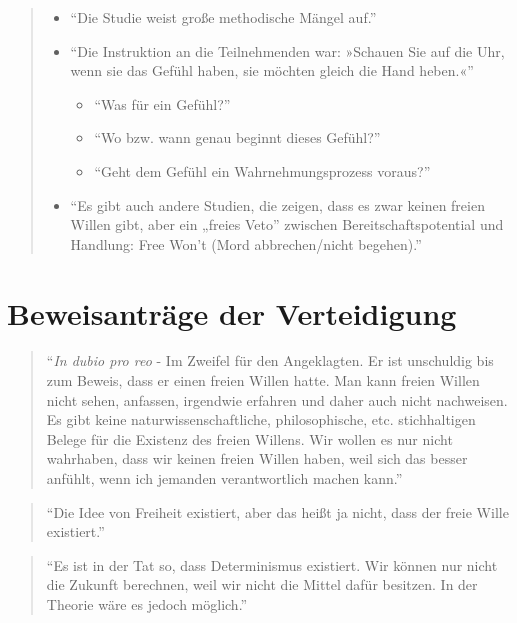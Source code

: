 \documentclass[
  a4paper,
]{report}
\begin{document}
\begin{quote}
\begin{itemize}
\item
  ``Die Studie weist große methodische Mängel auf.''
\item
  ``Die Instruktion an die Teilnehmenden war: »Schauen Sie auf die Uhr, wenn sie das Gefühl haben, sie möchten gleich die Hand heben.«''

  \begin{itemize}
  \item
    ``Was für ein Gefühl?''
  \item
    ``Wo bzw. wann genau beginnt dieses Gefühl?''
  \item
    ``Geht dem Gefühl ein Wahrnehmungsprozess voraus?''
  \end{itemize}
\item
  ``Es gibt auch andere Studien, die zeigen, dass es zwar keinen freien Willen gibt, aber ein „freies Veto'' zwischen Bereitschaftspotential und Handlung: Free Won't (Mord abbrechen/nicht begehen).''
\end{itemize}
\end{quote}

\hypertarget{def-ev}{%
\section{Beweisanträge der Verteidigung}\label{def-ev}}

\begin{quote}
``\emph{In dubio pro reo} - Im Zweifel für den Angeklagten. Er ist unschuldig bis zum Beweis, dass er einen freien Willen hatte. Man kann freien Willen nicht sehen, anfassen, irgendwie erfahren und daher auch nicht nachweisen. Es gibt keine naturwissenschaftliche, philosophische, etc. stichhaltigen Belege für die Existenz des freien Willens. Wir wollen es nur nicht wahrhaben, dass wir keinen freien Willen haben, weil sich das besser anfühlt, wenn ich jemanden verantwortlich machen kann.''
\end{quote}

\begin{quote}
``Die Idee von Freiheit existiert, aber das heißt ja nicht, dass der freie Wille existiert.''
\end{quote}

\begin{quote}
``Es ist in der Tat so, dass Determinismus existiert. Wir können nur nicht die Zukunft berechnen, weil wir nicht die Mittel dafür besitzen. In der Theorie wäre es jedoch möglich.''
\end{quote}
\end{document}
